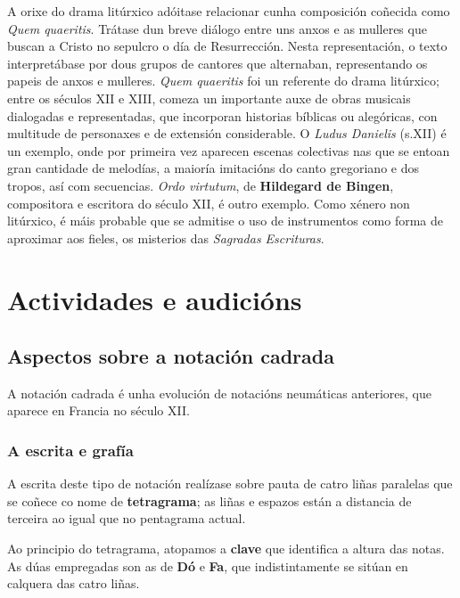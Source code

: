 \documentclass[a4paper, twoside]{templates/ociamthesis}
\begin{document}
A orixe do drama litúrxico adóitase relacionar cunha composición coñecida como \emph{Quem quaeritis}. Trátase dun breve diálogo entre uns anxos e as mulleres que buscan a Cristo no sepulcro o día de Resurrección. Nesta representación, o texto interpretábase por dous grupos de cantores que alternaban, representando os papeis de anxos e mulleres. \emph{Quem quaeritis} foi un referente do drama litúrxico; entre os séculos XII e XIII, comeza un importante auxe de obras musicais dialogadas e representadas, que incorporan historias bíblicas ou alegóricas, con multitude de personaxes e de extensión considerable. O \emph{Ludus Danielis} (s.XII) é un exemplo, onde por primeira vez aparecen escenas colectivas nas que se entoan gran cantidade de melodías, a maioría imitacións do canto gregoriano e dos tropos, así com secuencias. \emph{Ordo virtutum}, de \textbf{Hildegard de Bingen}, compositora e escritora do século XII, é outro exemplo. Como xénero non litúrxico, é máis probable que se admitise o uso de instrumentos como forma de aproximar aos fieles, os misterios das \emph{Sagradas Escrituras}.

\newpage

\hypertarget{actividades-e-audiciuxf3ns-2}{%
\section{Actividades e audicións}\label{actividades-e-audiciuxf3ns-2}}

\hypertarget{aspectos-sobre-a-notaciuxf3n-cadrada}{%
\subsection{Aspectos sobre a notación cadrada}\label{aspectos-sobre-a-notaciuxf3n-cadrada}}

A notación cadrada é unha evolución de notacións neumáticas anteriores, que aparece en Francia no século XII.

\hypertarget{a-escrita-e-grafuxeda}{%
\subsubsection{A escrita e grafía}\label{a-escrita-e-grafuxeda}}

A escrita deste tipo de notación realízase sobre pauta de catro liñas paralelas que se coñece co nome de \textbf{tetragrama}; as liñas e espazos están a distancia de terceira ao igual que no pentagrama actual.

Ao principio do tetragrama, atopamos a \textbf{clave} que identifica a altura das notas. As dúas empregadas son as de \textbf{Dó} e \textbf{Fa}, que indistintamente se sitúan en calquera das catro liñas.
\end{document}
